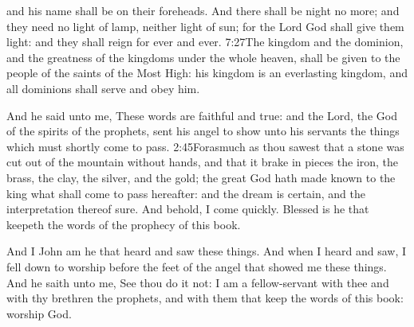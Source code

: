 and his name shall be on their foreheads. 
And there shall be night no more; and they need no light of lamp, neither light of sun; for the Lord God shall give them light:%
and they shall reign for ever and ever.%
					{7:27}{The kingdom and the dominion, and the greatness of the kingdoms under the whole heaven, shall be given to the people of the saints of the Most High: his kingdom is an everlasting kingdom, and all dominions shall serve and obey him.} %

And he said unto me, These words are faithful and true: and the Lord, the God of the spirits of the prophets, sent his angel to show unto his servants the things which must shortly come to pass.%
			{2:45}{Forasmuch as thou sawest that a stone was cut out of the mountain without hands, and that it brake in pieces the iron, the brass, the clay, the silver, and the gold; the great God hath made known to the king what shall come to pass hereafter: and the dream is certain, and the interpretation thereof sure.} %
And behold, I come quickly.%
Blessed is he that keepeth the words of the prophecy of this book.

And I John am he that heard and saw these things. And when I heard and saw, I fell down to worship before the feet of the angel that showed me these things. 
And he saith unto me, See thou do it not: I am a fellow-servant with thee and with thy brethren the prophets, and with them that keep the words of this book: worship God.

